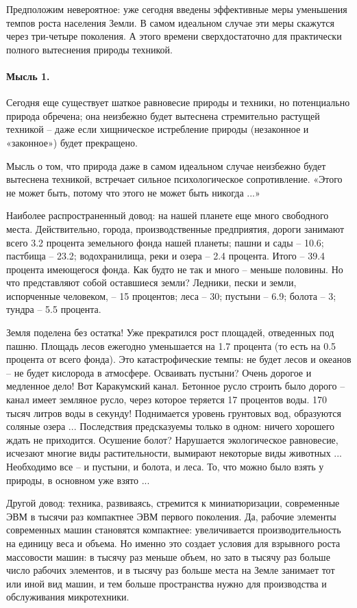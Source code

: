 \documentclass[11pt,a4paper]{article}
\begin{document}
Предположим невероятное: уже сегодня введены эффективные меры уменьшения
темпов роста населения Земли. В самом идеальном случае эти меры скажутся через
три-четыре поколения. А этого времени сверхдостаточно для практически полного
вытеснения природы техникой.

\paragraph{Мысль 1.}
Сегодня еще существует шаткое равновесие природы и техники, но потенциально
природа обречена; она неизбежно будет вытеснена стремительно растущей техникой
-- даже если хищническое истребление природы (незаконное и «законное») будет
прекращено.

Мысль о том, что природа даже в самом идеальном случае неизбежно будет
вытеснена техникой, встречает сильное психологическое сопротивление. «Этого не
может быть, потому что этого не может быть никогда ...»

Наиболее распространенный довод: на нашей планете еще много свободного места.
Действительно, города, производственные предприятия, дороги занимают всего 3.2
процента земельного фонда нашей планеты; пашни и сады -- 10.6; пастбища --
23.2; водохранилища, реки и озера -- 2.4 процента. Итого -- 39.4 процента
имеющегося фонда. Как будто не так и много -- меньше половины. Но что
представляют собой оставшиеся земли? Ледники, пески и земли, испорченные
человеком, -- 15 процентов; леса -- 30; пустыни -- 6.9; болота -- 3; тундра --
5.5 процента.

Земля поделена без остатка! Уже прекратился рост площадей, отведенных под
пашню. Площадь лесов ежегодно уменьшается на 1.7 процента (то есть на 0.5
процента от всего фонда). Это катастрофические темпы: не будет лесов и океанов
-- не будет кислорода в атмосфере. Осваивать пустыни? Очень дорогое и
медленное дело! Вот Каракумский канал. Бетонное русло строить было дорого --
канал имеет земляное русло, через которое теряется 17 процентов воды. 170
тысяч литров воды в секунду! Поднимается уровень грунтовых вод, образуются
соляные озера ... Последствия предсказуемы только в одном: ничего хорошего
ждать не приходится. Осушение болот? Нарушается экологическое равновесие,
исчезают многие виды растительности, вымирают некоторые виды животных ...
Необходимо все -- и пустыни, и болота, и леса. То, что можно было взять у
природы, в основном уже взято ...

Другой довод: техника, развиваясь, стремится к миниатюризации, современные ЭВМ
в тысячи раз компактнее ЭВМ первого поколения. Да, рабочие элементы
современных машин становятся компактнее: увеличивается производительность на
единицу веса и объема. Но именно это создает условия для взрывного роста
массовости машин: в тысячу раз меньше объем, но зато в тысячу раз больше число
рабочих элементов, и в тысячу раз больше места на Земле занимает тот или иной
вид машин, и тем больше пространства нужно для производства и обслуживания
микротехники.
\end{document}
